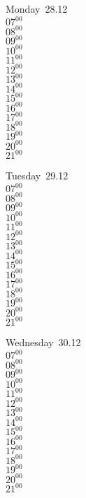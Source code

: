 \documentclass[11pt,a4paper]{book}\usepackage[]{graphicx}\usepackage[]{color}
\begin{document}
\begin{headerbox}
\end{headerbox}
\begin{weekdaybox}
  Monday~28.12\\
  { 
  \vfill
  $07^{00}$\\
$08^{00}$\\
$09^{00}$\\
$10^{00}$\\
$11^{00}$\\
$12^{00}$\\
$13^{00}$\\
$14^{00}$\\
$15^{00}$\\
$16^{00}$\\
$17^{00}$\\
$18^{00}$\\
$19^{00}$\\
$20^{00}$\\
$21^{00}$\\
  }
\end{weekdaybox}
\begin{weekdaybox}
  Tuesday~29.12\\
  { 
  \vfill
  $07^{00}$\\
$08^{00}$\\
$09^{00}$\\
$10^{00}$\\
$11^{00}$\\
$12^{00}$\\
$13^{00}$\\
$14^{00}$\\
$15^{00}$\\
$16^{00}$\\
$17^{00}$\\
$18^{00}$\\
$19^{00}$\\
$20^{00}$\\
$21^{00}$\\
  }
\end{weekdaybox}
\begin{weekdaybox}
  Wednesday~30.12\\
  { 
  \vfill
  $07^{00}$\\
$08^{00}$\\
$09^{00}$\\
$10^{00}$\\
$11^{00}$\\
$12^{00}$\\
$13^{00}$\\
$14^{00}$\\
$15^{00}$\\
$16^{00}$\\
$17^{00}$\\
$18^{00}$\\
$19^{00}$\\
$20^{00}$\\
$21^{00}$\\
  }
\end{weekdaybox}
\end{document}
